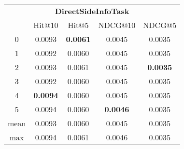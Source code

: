 \documentclass{article}
\begin{document}
 

\begin{tabular}{c|cccc}

\multicolumn{5}{c}{\textbf{DirectSideInfoTask}} \\
\noalign{\smallskip}
\noalign{\smallskip}
\toprule
\multicolumn{1}{c}{Template ID} & \multicolumn{1}{|c}{Hit@10} & \multicolumn{1}{c}{Hit@5} & \multicolumn{1}{c}{NDCG@10} & \multicolumn{1}{c}{NDCG@5} \\
\midrule
0 & 0.0093 & \textbf{0.0061} & 0.0045 & 0.0035 \\
1 & 0.0092 & 0.0060 & 0.0045 & 0.0035 \\
2 & 0.0093 & 0.0061 & 0.0045 & \textbf{0.0035} \\
3 & 0.0092 & 0.0060 & 0.0045 & 0.0035 \\
4 & \textbf{0.0094} & 0.0060 & 0.0045 & 0.0035 \\
5 & 0.0094 & 0.0060 & \textbf{0.0046} & 0.0035 \\
\midrule
mean & 0.0093 & 0.0060 & 0.0045 & 0.0035 \\
max & 0.0094 & 0.0061 & 0.0046 & 0.0035 \\
\bottomrule

\end{tabular}
\end{document}
